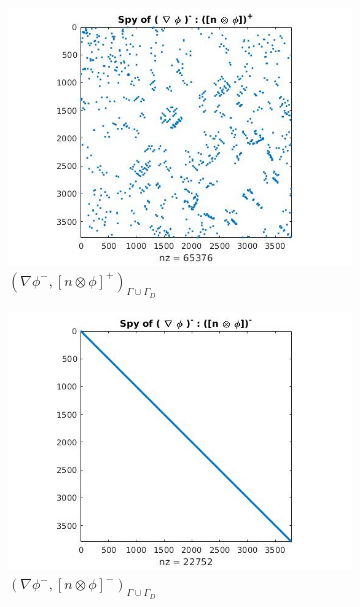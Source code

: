 \documentclass[a4paper]{book}
\begin{document}
\begin{figure}[H]
\begin{subfigure}{.5\textwidth}
  \includegraphics[width=\linewidth]{figure33.jpg}
  \caption{$( \nabla \phi^- ,[n \otimes \phi]^+)_{\Gamma \cup \Gamma_D}$}
  \label{fig:figure33}
\end{subfigure}
\begin{subfigure}{.5\textwidth}	
\centering
  \includegraphics[width=\linewidth]{figure34.jpg}
  \caption{$( \nabla \phi^- ,[n \otimes \phi]^-)_{\Gamma \cup \Gamma_D}$}
  \label{fig:figure34}
\end{subfigure}
\begin{subfigure}{\textwidth}	
\centering

\end{subfigure}
\end{figure}
\end{document}
